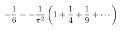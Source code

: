 \documentclass[preview]{standalone}
\begin{document}
\begin{align*}
\special{dvisvgm:raw <g id='unique000'>}-\frac{1}{6} = -\frac{1}{\pi^2}\left(1 + \frac{1}{4} + \frac{1}{9} + \cdots\right)\special{dvisvgm:raw </g>}
\end{align*}
\end{document}

